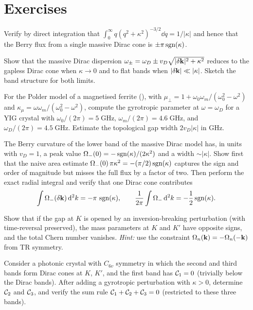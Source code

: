 \section*{Exercises}

\begin{exercise}
  Verify by direct integration that
  $\int_0^\infty q(q^2+\kappa^2)^{-3/2}\dd q=1/|\kappa|$
  and hence that the Berry flux from a single massive Dirac cone is
  $\pm\pi\operatorname{sgn}(\kappa)$.
\end{exercise}

\begin{exercise}
  Show that the massive Dirac dispersion
  $\omega_\pm=\omega_D\pm v_D\sqrt{|\delta\mathbf{k}|^2+\kappa^2}$
  reduces to the gapless Dirac cone when $\kappa\to 0$ and to flat
  bands when $|\delta\mathbf{k}|\ll|\kappa|$.  Sketch the band structure for
  both limits.
\end{exercise}

\begin{exercise}
  For the Polder model of a magnetised ferrite
  (), with $\mu_\perp=1+\omega_0\omega_m/
  (\omega_0^2-\omega^2)$ and $\kappa_\mu=\omega\omega_m/
  (\omega_0^2-\omega^2)$, compute the gyrotropic parameter at
  $\omega=\omega_D$ for a YIG crystal with $\omega_0/(2\pi)=5\;\mathrm{GHz}$,
  $\omega_m/(2\pi)=4.6\;\mathrm{GHz}$, and $\omega_D/(2\pi)=4.5\;\mathrm{GHz}$.
  Estimate the topological gap width $2v_D|\kappa|$ in GHz.
\end{exercise}

\begin{exercise}
  The Berry curvature of the lower band of the massive Dirac model has,
  in units with $v_D=1$, a peak value
  $\Omega_-(0)=-\operatorname{sgn}(\kappa)/(2\kappa^2)$ and a width
  $\sim|\kappa|$.  Show first that the naive area estimate
  $\Omega_-(0)\,\pi\kappa^2=-(\pi/2)\operatorname{sgn}(\kappa)$ captures the sign and order of
  magnitude but misses the full flux by a factor of two.  Then perform
  the exact radial integral and verify that one Dirac cone contributes
  \[
    \int \Omega_-(\delta\mathbf{k})\,\mathrm{d}^2k=-\pi\,\operatorname{sgn}(\kappa),
    \qquad
    \frac{1}{2\pi}\int \Omega_-\,\mathrm{d}^2k=-\frac{1}{2}\operatorname{sgn}(\kappa).
  \]
\end{exercise}

\begin{exercise}
  Show that if the gap at $K$ is opened by an inversion-breaking
  perturbation (with time-reversal preserved), the mass parameters at
  $K$ and $K'$ have opposite signs, and the total Chern number vanishes.
  \emph{Hint:} use the constraint
  $\Omega_n(\mathbf{k})=-\Omega_n(-\mathbf{k})$ from TR symmetry.
\end{exercise}

\begin{exercise}
  Consider a photonic crystal with $C_{6v}$ symmetry in which the
  second and third bands form Dirac cones at $K$, $K'$, and the
  first band has $\mathcal{C}_1=0$ (trivially below the Dirac bands).
  After adding a gyrotropic perturbation with $\kappa>0$, determine
  $\mathcal{C}_2$ and $\mathcal{C}_3$, and verify the sum rule
  $\mathcal{C}_1+\mathcal{C}_2+\mathcal{C}_3=0$ (restricted to these three bands).
\end{exercise}
